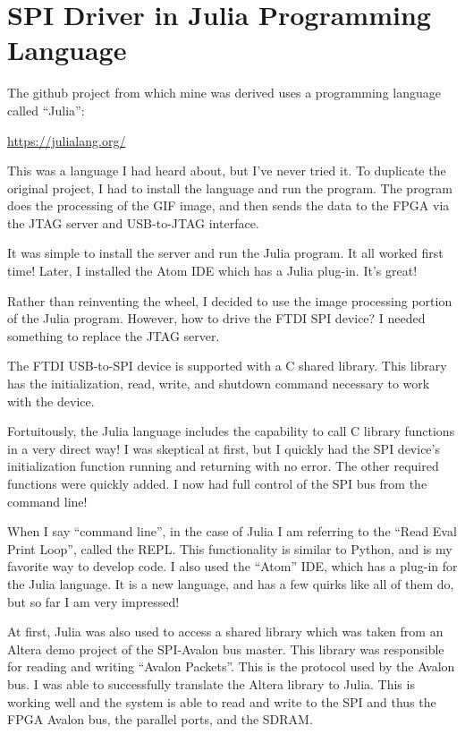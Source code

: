\section{SPI Driver in Julia Programming Language}

The github project from which mine was derived uses a programming language called ``Julia'':

\url{https://julialang.org/}

This was a language I had heard about, but I've never tried it.
To duplicate the original project, I had to install the language and run the program.
The program does the processing of the GIF image, and then sends the data to the FPGA
via the JTAG server and USB-to-JTAG interface.

It was simple to install the server and run the Julia program.  It all worked first time!
Later, I installed the Atom IDE which has a Julia plug-in.  It's great!

Rather than reinventing the wheel, I decided to use the image processing portion of the Julia program.
However, how to drive the FTDI SPI device?  I needed something to replace the JTAG server.

The FTDI USB-to-SPI device is supported with a C shared library.  This library has the initialization, read, write, and shutdown
command necessary to work with the device.

Fortuitously, the Julia language includes the capability to call C library functions in a very direct way!
I was skeptical at first, but I quickly had the SPI device's initialization function running and returning with no error.
The other required functions were quickly added.  I now had full control of the SPI bus from the command line!

When I say ``command line'', in the case of Julia I am referring to the ``Read Eval Print Loop'', called the REPL.  This functionality is similar to Python, and is my favorite way to develop code.  I also used the ``Atom'' IDE, which has a plug-in for the Julia language.
It is a new language, and has a few quirks like all of them do, but so far I am very impressed!

At first, Julia was also used to access a shared library which was taken from an Altera demo project of the SPI-Avalon bus master.
This library was responsible for reading and writing ``Avalon Packets''.  This is the protocol used by the Avalon bus.  I was able to successfully translate the Altera library to Julia.  This is working well and the system is able to read and write to the SPI and thus the FPGA Avalon bus, the parallel ports, and the SDRAM.

